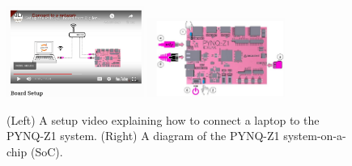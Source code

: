 \documentclass[../../../main.tex]{subfiles}
\begin{document}
\\
\vspace{0.25cm}

\begin{figure}
\centering
\includegraphics[width=0.4\textwidth]{figures/pynq1.png}
\includegraphics[width=0.4\textwidth]{figures/pynq2.png}
\caption{\label{fig:pynq} (Left) A setup video explaining how to connect a laptop to the PYNQ-Z1 system. (Right) A diagram of the PYNQ-Z1 system-on-a-chip (SoC).}
\end{figure}
\end{document}

